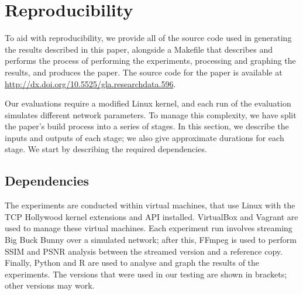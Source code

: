 \documentclass[sigconf]{acmart}
\begin{document}



\maketitle









\appendix
\section{Reproducibility}

To aid with reproducibility, we provide all of the source code used in generating the
results described in this paper, alongside a Makefile that describes and performs the
process of performing the experiments, processing and graphing the results, and produces
the paper. The source code for the paper is available at \url{http://dx.doi.org/10.5525/gla.researchdata.596}.

Our evaluations require a modified Linux kernel, and each run of the evaluation simulates
different network parameters. To manage this complexity, we have split the paper's build
process into a series of stages. In this section, we describe the inputs and outputs of
each stage; we also give approximate durations for each stage.
We start by describing the required dependencies.

\subsection*{Dependencies}

The experiments are conducted within virtual machines, that use Linux with the TCP
Hollywood kernel extensions and API installed. VirtualBox and Vagrant are used to manage
these virtual machines. Each experiment run involves streaming Big Buck Bunny over a 
simulated network; after this, FFmpeg is used to perform SSIM and PSNR analysis between
the streamed version and a reference copy. Finally, Python and R are used to analyse and
graph the results of the experiments. The versions that were used in our testing are shown
in brackets; other versions may work.
\end{document}
